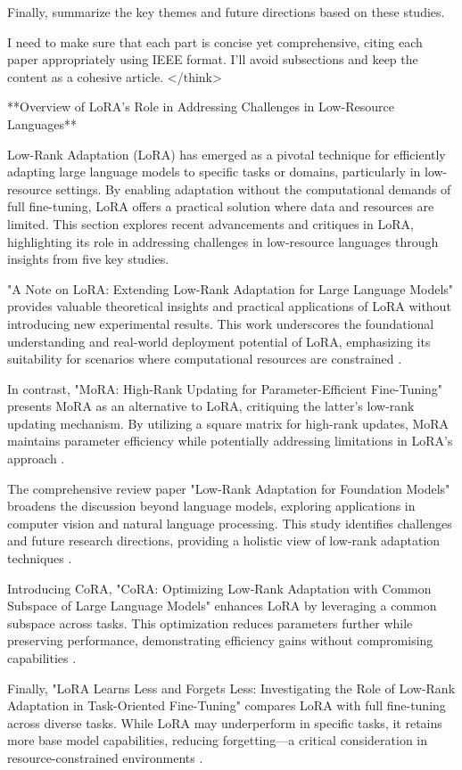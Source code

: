 \documentclass[conference]{IEEEtran}
\begin{document}
Finally, summarize the key themes and future directions based on these studies.

I need to make sure that each part is concise yet comprehensive, citing each paper appropriately using IEEE format. I'll avoid subsections and keep the content as a cohesive article.
</think>

**Overview of LoRA's Role in Addressing Challenges in Low-Resource Languages**

Low-Rank Adaptation (LoRA) has emerged as a pivotal technique for efficiently adapting large language models to specific tasks or domains, particularly in low-resource settings. By enabling adaptation without the computational demands of full fine-tuning, LoRA offers a practical solution where data and resources are limited. This section explores recent advancements and critiques in LoRA, highlighting its role in addressing challenges in low-resource languages through insights from five key studies.

"A Note on LoRA: Extending Low-Rank Adaptation for Large Language Models" provides valuable theoretical insights and practical applications of LoRA without introducing new experimental results. This work underscores the foundational understanding and real-world deployment potential of LoRA, emphasizing its suitability for scenarios where computational resources are constrained \cite{aX}.

In contrast, "MoRA: High-Rank Updating for Parameter-Efficient Fine-Tuning" presents MoRA as an alternative to LoRA, critiquing the latter's low-rank updating mechanism. By utilizing a square matrix for high-rank updates, MoRA maintains parameter efficiency while potentially addressing limitations in LoRA's approach \cite{bX}.

The comprehensive review paper "Low-Rank Adaptation for Foundation Models" broadens the discussion beyond language models, exploring applications in computer vision and natural language processing. This study identifies challenges and future research directions, providing a holistic view of low-rank adaptation techniques \cite{cX}.

Introducing CoRA, "CoRA: Optimizing Low-Rank Adaptation with Common Subspace of Large Language Models" enhances LoRA by leveraging a common subspace across tasks. This optimization reduces parameters further while preserving performance, demonstrating efficiency gains without compromising capabilities \cite{dX}.

Finally, "LoRA Learns Less and Forgets Less: Investigating the Role of Low-Rank Adaptation in Task-Oriented Fine-Tuning" compares LoRA with full fine-tuning across diverse tasks. While LoRA may underperform in specific tasks, it retains more base model capabilities, reducing forgetting—a critical consideration in resource-constrained environments \cite{eX}.
\end{document}
